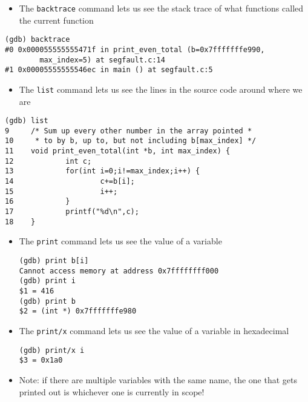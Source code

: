 \documentclass{article}
\begin{document}
\begin{itemize}
\item The \verb!backtrace! command lets us see the stack trace of what functions called the current function
\end{itemize}
\begin{verbatim}
(gdb) backtrace
#0 0x000055555555471f in print_even_total (b=0x7fffffffe990,
        max_index=5) at segfault.c:14
#1 0x00005555555546ec in main () at segfault.c:5
\end{verbatim}
\begin{itemize}
\item The \verb!list! command lets us see the lines in the source code around where we are
\end{itemize}
\begin{verbatim}
(gdb) list
9     /* Sum up every other number in the array pointed *
10     * to by b, up to, but not including b[max_index] */
11    void print_even_total(int *b, int max_index) {
12            int c;
13            for(int i=0;i!=max_index;i++) {
14                    c+=b[i];
15                    i++;
16            }
17            printf("%d\n",c);
18    }
\end{verbatim}



\begin{itemize}
\item The \verb!print! command lets us see the value of a variable
\begin{verbatim}
(gdb) print b[i]
Cannot access memory at address 0x7ffffffff000
(gdb) print i
$1 = 416
(gdb) print b
$2 = (int *) 0x7fffffffe980
\end{verbatim}
\item The \verb!print/x! command lets us see the value of a variable in hexadecimal
\begin{verbatim}
(gdb) print/x i
$3 = 0x1a0
\end{verbatim}
\item Note: if there are multiple variables with the same name, the one that gets printed out is whichever one is currently in scope!
\end{itemize}
\end{document}
